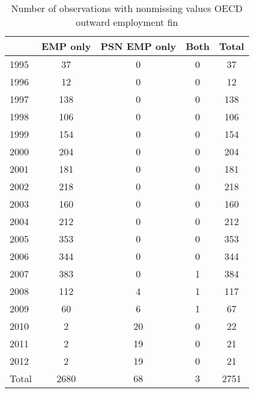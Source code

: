 \begin{table}[htbp]\centering
\caption{Number of observations with nonmissing values OECD outward employment fin}
\begin{tabular}{l*{4}{c}}
\toprule
            &    EMP only&PSN EMP only&        Both&       Total\\
\midrule
1995        &          37&           0&           0&          37\\
1996        &          12&           0&           0&          12\\
1997        &         138&           0&           0&         138\\
1998        &         106&           0&           0&         106\\
1999        &         154&           0&           0&         154\\
2000        &         204&           0&           0&         204\\
2001        &         181&           0&           0&         181\\
2002        &         218&           0&           0&         218\\
2003        &         160&           0&           0&         160\\
2004        &         212&           0&           0&         212\\
2005        &         353&           0&           0&         353\\
2006        &         344&           0&           0&         344\\
2007        &         383&           0&           1&         384\\
2008        &         112&           4&           1&         117\\
2009        &          60&           6&           1&          67\\
2010        &           2&          20&           0&          22\\
2011        &           2&          19&           0&          21\\
2012        &           2&          19&           0&          21\\
Total       &        2680&          68&           3&        2751\\
\bottomrule
\end{tabular}
\end{table}
